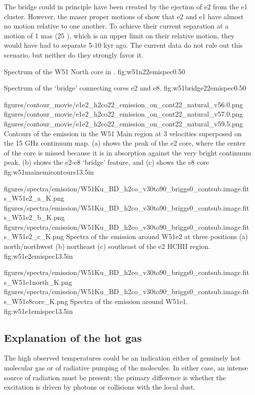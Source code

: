 The bridge could in principle have been created by the ejection of e2 from the
e1 cluster.  However, the maser proper motions of \citep{Sato2014a} show that
e2 and e1 have almost no motion relative to one another.  To achieve their
current separation at a motion of 1 mas \peryr (25 \kms), which is an upper
limit on their relative motion, they would have had to separate 5-10 kyr ago.
The current data do not rule out this scenario, but neither do they strongly
favor it.

{Spectrum of the W51 North core in \ortho \twotwo.}
{fig:w51n22emispec}{0.5}{0}

{Spectrum of the `bridge' connecting cores e2 and e8.}
{fig:w51bridge22emispec}{0.5}{0}

\FigureThreeAA
{figures/contour_movie/e1e2_h2co22_emission_on_cont22_natural_v56.0.png}
{figures/contour_movie/e1e2_h2co22_emission_on_cont22_natural_v57.0.png}
{figures/contour_movie/e1e2_h2co22_emission_on_cont22_natural_v59.5.png}
{Contours of the \formaldehyde \twotwo emission in the W51 Main region at 3
velocities superposed on the 15 GHz continuum map.  (a) shows the peak of the e2
core, where the center of the core is missed because it is in absorption
against the very bright continuum peak, (b) shows the e2-e8 `bridge' feature,
and (c) shows the e8 core}
{fig:w51mainemicontours}{1}{3.5in}

\FigureThreeAA
{figures/spectra/emission/W51Ku_BD_h2co_v30to90_briggs0_contsub.image.fits_W51e2_a_K.png}
{figures/spectra/emission/W51Ku_BD_h2co_v30to90_briggs0_contsub.image.fits_W51e2_b_K.png}
{figures/spectra/emission/W51Ku_BD_h2co_v30to90_briggs0_contsub.image.fits_W51e2_c_K.png}
{Spectra of the \twotwo emission around W51e2 at three positions (a)
north/northwest (b) northeast (c) southeast of the e2 HCHII region.
}
{fig:w51e2emispec}{1}{3.5in}

\FigureTwoAA
{figures/spectra/emission/W51Ku_BD_h2co_v30to90_briggs0_contsub.image.fits_W51e1north_K.png}
{figures/spectra/emission/W51Ku_BD_h2co_v30to90_briggs0_contsub.image.fits_W51e8core_K.png}
{Spectra of the \twotwo emission around W51e1.
}
{fig:w51e1emispec}{1}{3.5in}

\subsection{Explanation of the hot gas}
The high observed temperatures could be an indication either of genuinely hot
molecular gas or of radiative pumping of the \formaldehyde molecules.  In
either case, an intense source of radiation must be present; the primary
difference is whether the excitation is driven by photons or collisions with
the local dust.

